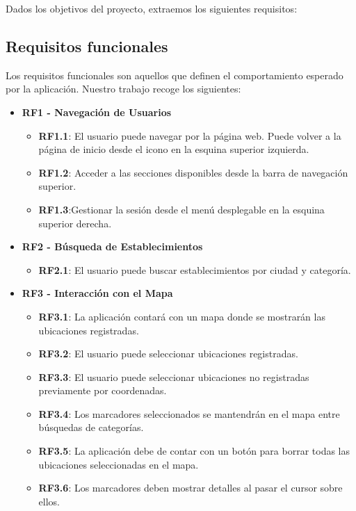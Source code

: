 Dados los objetivos del proyecto, extraemos los siguientes requisitos:

\subsection{Requisitos funcionales}

Los requisitos funcionales son aquellos que definen el comportamiento esperado por la aplicación. Nuestro trabajo recoge los siguientes:

\begin{itemize}
	\item \textbf{RF1 - Navegación de Usuarios}
		\begin{itemize}
  			\item \textbf{RF1.1}: El usuario puede navegar por la página web.
			 Puede volver a la página de inicio desde el icono en la esquina superior izquierda.
			\item \textbf{RF1.2}: Acceder a las secciones disponibles desde la barra de navegación superior.
			\item \textbf{RF1.3}:Gestionar la sesión desde el menú desplegable en la esquina superior derecha.
		\end{itemize}
	\item \textbf{RF2 - Búsqueda de Establecimientos}
	\begin{itemize}
		\item \textbf{RF2.1}: El usuario puede buscar establecimientos por ciudad y categoría.
	\end{itemize}
	\item \textbf{RF3 - Interacción con el Mapa}
		\begin{itemize}
			\item \textbf{RF3.1}: La aplicación contará con un mapa donde se mostrarán las ubicaciones registradas.
			\item \textbf{RF3.2}: El usuario puede seleccionar ubicaciones registradas.
			\item \textbf{RF3.3}: El usuario puede seleccionar ubicaciones no registradas previamente por coordenadas.
			\item \textbf{RF3.4}: Los marcadores seleccionados se mantendrán en el mapa entre búsquedas de categorías.
			\item \textbf{RF3.5}: La aplicación debe de contar con un botón para borrar todas las ubicaciones seleccionadas en el mapa.
			\item \textbf{RF3.6}: Los marcadores deben mostrar detalles al pasar el cursor sobre ellos.

\end{itemize}
\end{itemize}
